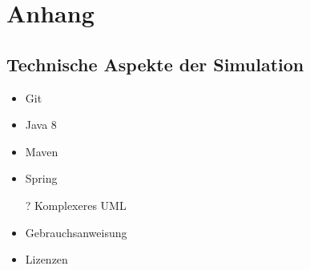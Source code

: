 \section*{Anhang}
\subsection*{Technische Aspekte der Simulation}
\begin{itemize}
	\item Git
	\item Java 8
	\item Maven
	\item Spring
	\item[?] Komplexeres UML
	\item Gebrauchsanweisung
	\item Lizenzen
\end{itemize}
